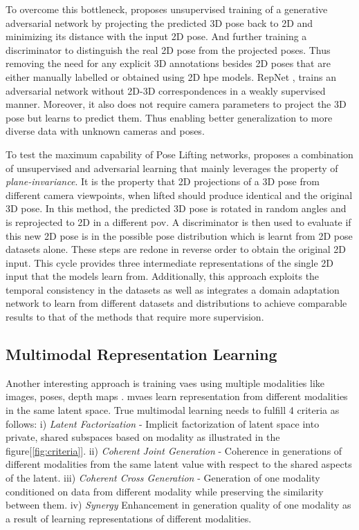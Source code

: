 To overcome this bottleneck, \cite{unsupervisedAdversarial} proposes unsupervised training of a generative adversarial network by projecting the predicted 3D pose back to 2D and minimizing its distance with the input 2D pose. And further training a discriminator to distinguish the real 2D pose from the projected poses. Thus removing the need for any explicit 3D annotations besides 2D poses that are either manually labelled or obtained using 2D \ac{hpe} models. RepNet \cite{repnet}, trains an adversarial network without 2D-3D correspondences in a weakly supervised manner. Moreover, it also does not require camera parameters to project the 3D pose but learns to predict them. Thus enabling better generalization to more diverse data with unknown cameras and poses.

To test the maximum capability of Pose Lifting networks, \cite{amazon1} proposes a combination of unsupervised and adversarial learning that mainly leverages the property of \textit{plane-invariance}. It is the property that 2D projections of a 3D pose from different camera viewpoints, when lifted should produce identical and the original 3D pose. In this method, the predicted 3D pose is rotated in random angles and is reprojected to 2D in a different \ac{pov}. A discriminator is then used to evaluate if this new 2D pose is in the possible pose distribution which is learnt from 2D pose datasets alone. These steps are redone in reverse order to obtain the original 2D input. This cycle provides three intermediate representations of the single 2D input that the models learn from. Additionally, this approach exploits the temporal consistency in the datasets as well as integrates a domain adaptation network to learn from different datasets and distributions to achieve comparable results to that of the methods that require more supervision.


\subsection{Multimodal Representation Learning}
\label{section:multimodal_representation_learning}
Another interesting approach is training \ac{vae}s using multiple modalities like images, poses, depth maps \cite{CrossingNets, crossmodal, MMVAE,HandDisentangled}. \ac{mvae}s learn representation from different modalities in the same latent space. True multimodal learning needs to fulfill 4 criteria as follows: i) \textit{Latent Factorization} - Implicit factorization of latent space into private, shared subspaces based on modality as illustrated in the figure[\ref{fig:criteria}]. ii) \textit{Coherent Joint Generation} - Coherence in generations of different modalities from the same latent value with respect to the shared aspects of the latent. iii) \textit{Coherent Cross Generation} - Generation of one modality conditioned on data from different modality while preserving the similarity between them. iv) \textit{Synergy} Enhancement in generation quality of one modality as a result of learning representations of different modalities.

